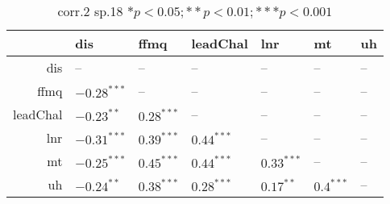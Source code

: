 \begin{table}[ht]
\centering
\begin{tabular}{rllllll}
  \hline
 & dis & ffmq & leadChal & lnr & mt & uh \\ 
  \hline
dis & -- & -- & -- & -- & -- & -- \\ 
  ffmq & $-0.28^{***}$ & -- & -- & -- & -- & -- \\ 
  leadChal & $-0.23^{**}$ & $0.28^{***}$ & -- & -- & -- & -- \\ 
  lnr & $-0.31^{***}$ & $0.39^{***}$ & $0.44^{***}$ & -- & -- & -- \\ 
  mt & $-0.25^{***}$ & $0.45^{***}$ & $0.44^{***}$ & $0.33^{***}$ & -- & -- \\ 
  uh & $-0.24^{**}$ & $0.38^{***}$ & $0.28^{***}$ & $0.17^{**}$ & $0.4^{***}$ & -- \\ 
   \hline
\end{tabular}
\caption{corr.2 sp.18 $* p < 0.05; ** p < 0.01; *** p < 0.001$} 
\label{freq_corr.corr.2.sp.18}
\end{table}
